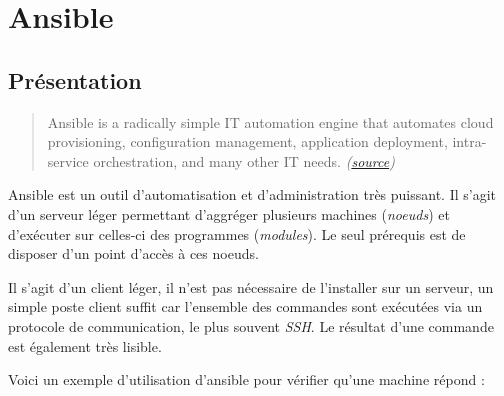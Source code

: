 \documentclass[12pt,a4paper]{article}
\newenvironment{Shaded}{}{}
\newcommand{\KeywordTok}[1]{\textcolor[rgb]{0.00,0.44,0.13}{\textbf{{#1}}}}
\newcommand{\StringTok}[1]{\textcolor[rgb]{0.25,0.44,0.63}{{#1}}}
\newcommand{\NormalTok}[1]{{#1}}
\begin{document}
  \newpage

  \section{Ansible}\label{ansible}

  \bigskip

  \subsection{Présentation}\label{pruxe9sentation}

  \bigskip

  \begin{quote}
  Ansible is a radically simple IT automation engine that automates cloud
  provisioning, configuration management, application deployment,
  intra-service orchestration, and many other IT needs.
  \emph{(\href{https://www.ansible.com/how-ansible-works}{source})}
  \end{quote}

  \bigskip

  Ansible est un outil d'automatisation et d'administration très puissant.
  Il s'agit d'un serveur léger permettant d'aggréger plusieurs machines
  (\emph{noeuds}) et d'exécuter sur celles-ci des programmes
  (\emph{modules}). Le seul prérequis est de disposer d'un point d'accès à
  ces noeuds.

  \bigskip

  Il s'agit d'un client léger, il n'est pas nécessaire de l'installer sur
  un serveur, un simple poste client suffit car l'ensemble des commandes
  sont exécutées via un protocole de communication, le plus souvent
  \emph{SSH}. Le résultat d'une commande est également très lisible.

  \bigskip

  Voici un exemple d'utilisation d'ansible pour vérifier qu'une machine
  répond :

  \begin{Shaded}
  \end{Shaded}
\end{document}

